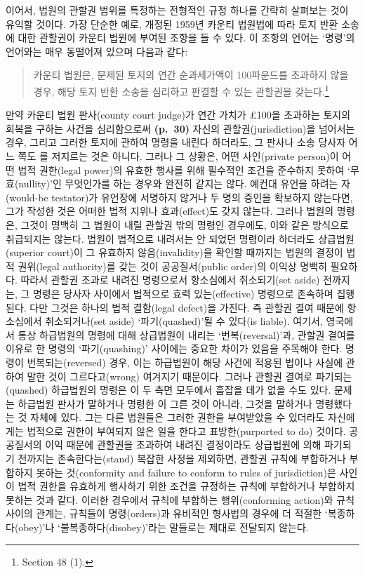 이어서, 법원의 관할권 범위를 특정하는 전형적인 규정 하나를 간략히
살펴보는 것이 유익할 것이다. 가장 단순한 예로, 개정된 1959년 카운티
법원법에 따라 토지 반환 소송에 대한 관할권이 카운티 법원에 부여된 조항을
들 수 있다. 이 조항의 언어는 ‘명령’의 언어와는 매우 동떨어져 있으며
다음과 같다:

\begin{quote}
카운티 법원은, 문제된 토지의 연간 순과세가액이 100파운드를 초과하지 않을
경우, 해당 토지 반환 소송을 심리하고 판결할 수 있는 관할권을
갖는다.\footnote{Section 48 (1).}
\end{quote}

만약 카운티 법원 판사(county court judge)가 연간 가치가 £100을 초과하는
토지의 회복을 구하는 사건을 심리함으로써 \textbf{(p.~30)} 자신의
관할권(jurisdiction)을 넘어서는 경우, 그리고 그러한 토지에 관하여 명령을
내린다 하더라도, 그 판사나 소송 당사자 어느 쪽도
를 저지르는 것은 아니다. 그러나 그 상황은, 어떤
사인(private person)이 어떤 법적 권한(legal power)의 유효한 행사를 위해
필수적인 조건을 준수하지 못하여 ‘무효(nullity)’인 무엇인가를 하는 경우와
완전히 같지는 않다. 예컨대 유언을 하려는 자(would-be testator)가
유언장에 서명하지 않거나 두 명의 증인을 확보하지 않는다면, 그가 작성한
것은 어떠한 법적 지위나 효과(effect)도 갖지 않는다. 그러나 법원의
명령은, 그것이 명백히 그 법원이 내릴 관할권 밖의 명령인 경우에도, 이와
같은 방식으로 취급되지는 않는다. 법원이 법적으로 내려서는 안 되었던
명령이라 하더라도 상급법원(superior court)이 그 유효하지
않음(invalidity)을 확인할 때까지는 법원의 결정이 법적 권위(legal
authority)를 갖는 것이 공공질서(public order)의 이익상 명백히 필요하다.
따라서 관할권 초과로 내려진 명령으로서 항소심에서 취소되기(set aside)
전까지는, 그 명령은 당사자 사이에서 법적으로 효력 있는(effective)
명령으로 존속하며 집행된다. 다만 그것은 하나의 법적 결함(legal defect)을
가진다. 즉 관할권 결여 때문에 항소심에서 취소되거나(set aside)
‘파기(quashed)’될 수 있다(is liable). 여기서, 영국에서 통상 하급법원의
명령에 대해 상급법원이 내리는 ‘번복(reversal)’과, 관할권 결여를 이유로
한 명령의 ‘파기(quashing)’ 사이에는 중요한 차이가 있음을 주목해야 한다.
명령이 번복되는(reversed) 경우, 이는 하급법원이 해당 사건에 적용된
법이나 사실에 관하여 말한 것이 그르다고(wrong) 여겨지기 때문이다. 그러나
관할권 결여로 파기되는(quashed) 하급법원의 명령은 이 두 측면 모두에서
흠잡을 데가 없을 수도 있다. 문제는 하급법원 판사가 말하거나 명령한
이 그른 것이 아니라, 그것을  말하거나
명령했다는 것 자체에 있다. 그는 다른 법원들은 그러한 권한을 부여받았을
수 있더라도 자신에게는 법적으로 권한이 부여되지 않은 일을 한다고
표방한(purported to do) 것이다. 공공질서의 이익 때문에 관할권을 초과하여
내려진 결정이라도 상급법원에 의해 파기되기 전까지는 존속한다는(stand)
복잡한 사정을 제외하면, 관할권 규칙에 부합하거나 부합하지 못하는
것(conformity and failure to conform to rules of jurisdiction)은 사인이
법적 권한을 유효하게 행사하기 위한 조건을 규정하는 규칙에 부합하거나
부합하지 못하는 것과 같다. 이러한 경우에서 규칙에 부합하는
행위(conforming action)와 규칙 사이의 관계는, 규칙들이 명령(orders)과
유비적인 형사법의 경우에 더 적절한 ‘복종하다(obey)’나
‘불복종하다(disobey)’라는 말들로는 제대로 전달되지 않는다.

